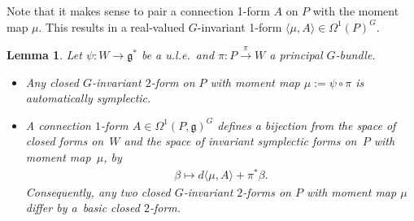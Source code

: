 \documentclass[10pt,a4paper]{amsart}
\numberwithin{equation}{section}
\newtheorem{Lemma}{Lemma}[section]
\begin{document}
Note that it makes sense to pair a connection 1-form $A$ on $P$
with the moment map $\mu$.  This results in a real-valued $G$-invariant 1-form
  $\langle \mu, A\rangle\in \Omega^1 (P)^G$.

\begin{Lemma}\label{lemma:nondeg}
  Let $\psi\colon W\to {\mathfrak g}^*$ be a u.l.e.\ and $\pi\colon P \xrightarrow{\pi}W$
  a principal $G$-bundle.
\begin{itemize}\itemsep=0pt
\item Any closed $G$-invariant $2$-form on $P$ with moment map $\mu:=
  \psi \circ \pi$ is automatically symplectic.
\item A connection $1$-form $A\in \Omega^1(P,{\mathfrak g})^G$ defines a bijection
  from the space of closed forms on~$W$ and the space of invariant
  symplectic forms on~$P$ with moment map~$\mu$, by
\begin{gather*}
\beta \mapsto d \langle \mu, A\rangle + \pi^*\beta.
\end{gather*}
Consequently, any two closed $G$-invariant $2$-forms on $P$ with moment
map $\mu$ differ by a~basic closed $2$-form.
\end{itemize}
\end{Lemma}
\end{document}
